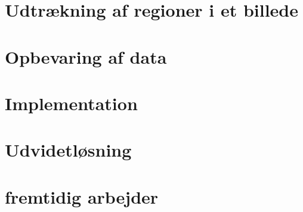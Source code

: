{\section{Udtrækning af regioner i et billede\label{section_udtraek}}


\section{Opbevaring af data\label{section_database}}


\section{Implementation}


\section{Udvidetløsning}


\section{fremtidig arbejder}

}


